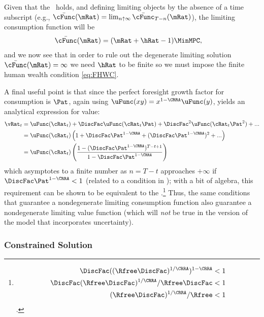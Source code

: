 \documentclass[BufferStockTheory]{subfiles}
\begin{document}
Given that the \RIC~holds, and defining limiting objects by the absence of a time subscript (e.g., $\bar{\cFunc}(\mRat)=\lim_{n \uparrow \infty} \bar{\cFunc}_{T-n}(\mRat)$), the limiting consumption function will be
\begin{align}\label{eq:cFuncPFUnc}
  \bar{\cFunc}(\mRat)  & = (\mRat+\hRat-1)\MinMPC, 
\end{align}
and we now see that in order to rule out the degenerate limiting
solution $\bar{\cFunc}(\mRat) = \infty$ we need $\hRat$ to be finite so we
must impose the finite human wealth condition \eqref{eq:FHWC}.

\hypertarget{ValuePFAnalytical}{}
A final useful point is that since the perfect foresight
growth factor for consumption is $\Pat$, again using $\uFunc(xy) =
x^{1-\CRRA}\uFunc(y)$, yields an analytical expression for value:  
\begin{align}
  \vRat_{t}  & = \uFunc(\cRat_{t})+\DiscFac \uFunc(\cRat_{t}\Pat)+\DiscFac^{2} \uFunc(\cRat_{t} \Pat^{2})+... \label{eq:ValuePFAnalytical}
  \\  & = \uFunc(\cRat_{t})\left(1+\DiscFac \Pat^{1-\CRRA}+(\DiscFac \Pat^{1-\CRRA})^{2}+...\right) \notag 
  \\  & = \uFunc(\cRat_{t})\left(\frac{1-(\DiscFac \Pat^{1-\CRRA})^{T-t+1}}{1-\DiscFac \Pat^{1-\CRRA}}\right) \notag
\end{align}
which asymptotes to a finite number as $n=T-t$ approaches $+\infty$ if $\DiscFac \Pat^{1-\CRRA} < 1$ (related to a condition in \cite{asHomogeneous}); with a bit of algebra, this requirement can be shown to be equivalent to the \RIC.\footnote{
  \begin{align*}
    \DiscFac ((\Rfree \DiscFac)^{1/\CRRA})^{1-\CRRA}  & < 1
    \\ \DiscFac (\Rfree\DiscFac)^{1/\CRRA}/\Rfree\DiscFac  & < 1
    \\ (\Rfree \DiscFac)^{1/\CRRA} /\Rfree  & < 1
  \end{align*}.
}  Thus, the same conditions that guarantee a nondegenerate limiting consumption function also guarantee a nondegenerate limiting value function (which will \textit{not} be true in the version of the model that incorporates uncertainty).


\hypertarget{Constrained-Solution}{}
\subsubsection{Constrained Solution}
\end{document}
